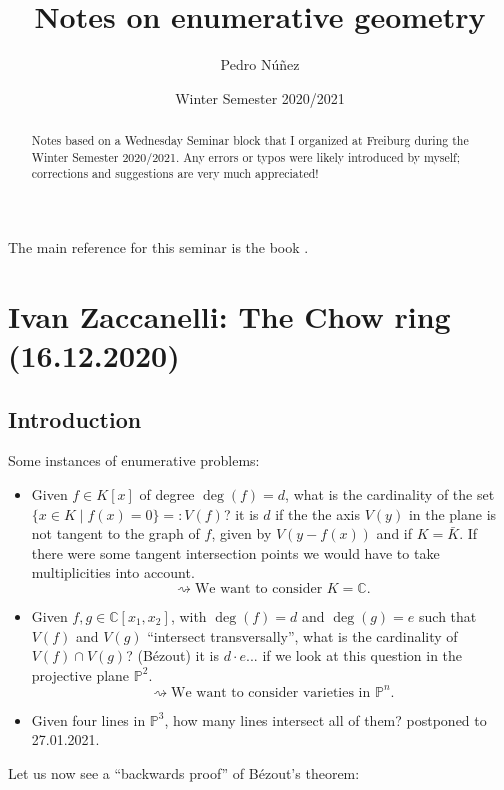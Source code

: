 \documentclass[12pt,a4paper]{amsart}
\title[Notes on enumerative geometry]{Notes on enumerative geometry}
\author[Pedro N\'{u}\~{n}ez]{Pedro N\'{u}\~{n}ez}
\date{Winter Semester 2020/2021}
\theoremstyle{plain}
\theoremstyle{definition}
\theoremstyle{remark}
\begin{document}
\maketitle

\begin{abstract}
	Notes based on a Wednesday Seminar block that I organized at Freiburg during the Winter Semester 2020/2021.
	Any errors or typos were likely introduced by myself; corrections and suggestions are very much appreciated!
\end{abstract}

\tableofcontents

The main reference for this seminar is the book \cite{eh16}.

\section{Ivan Zaccanelli: The Chow ring (16.12.2020)}

\subsection{Introduction}

Some instances of enumerative problems:

\begin{itemize}
    \item Given $f\in K[x]$ of degree $\deg(f)=d$, what is the cardinality of the set $\{ x\in K\mid f(x)=0\}=:V(f)$?
      \underline{} it is $d$ if the the axis $V(y)$ in the plane is not tangent to the graph of $f$, given by $V(y-f(x))$ and if $K=\bar{K}$.
	If there were some tangent intersection points we would have to take multiplicities into account.
	\[ \rightsquigarrow \text{We want to consider }K=\mathbb{C}. \]
    \item Given $f,g\in \mathbb{C}[x_{1},x_{2}]$, with $\deg(f)=d$ and $\deg(g)=e$ such that $V(f)$ and $V(g)$ ``intersect transversally'', what is the cardinality of $V(f)\cap V(g)$?
      \underline{} (Bézout) it is $d\cdot e$... if we look at this question in the projective plane $\mathbb{P}^{2}$.
	\[ \rightsquigarrow \text{We want to consider varieties in }\mathbb{P}^{n}. \]
    \item Given four lines in $\mathbb{P}^{3}$, how many lines intersect all of them?
      \underline{} postponed to 27.01.2021.
\end{itemize}

Let us now see a ``backwards proof'' of Bézout's theorem:
\end{document}
